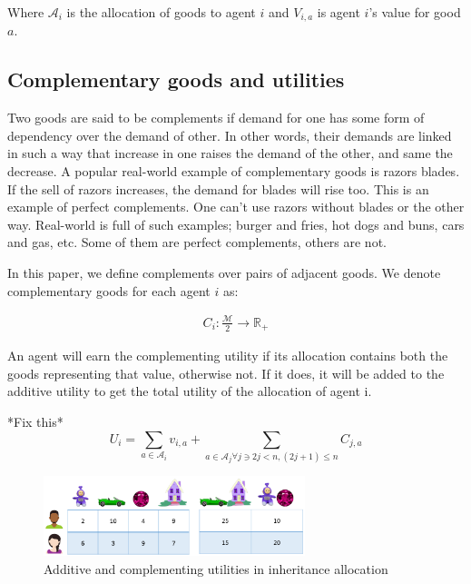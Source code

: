 Where $\mathcal{A}_i$ is the allocation of goods to agent $i$ and $V_{i,a}$ is agent $i$'s value for good $a$.

\subsection{Complementary goods and utilities}
\label{section_complementary}

Two goods are said to be complements if demand for one has some form of dependency over the demand of other. In other words, their demands are linked in such a way that increase in one raises the demand of the other, and same the decrease. A popular real-world example of complementary goods is razors blades. If the sell of razors increases, the demand for blades will rise too. This is an example of perfect complements. One can't use razors without blades or the other way. Real-world is full of such examples; burger and fries, hot dogs and buns, cars and gas, etc. Some of them are perfect complements, others are not.

In this paper, we define complements over pairs of adjacent goods. We denote complementary goods for each agent $i$ as: 

\begin{gather}
    C_i: \frac{\mathcal{M}}{2} \rightarrow \mathbb{R_+}
\end{gather}

An agent will earn the complementing utility if its allocation contains both the goods representing that value, otherwise not. If it does, it will be added to the additive utility to get the total utility of the allocation of agent i.

*Fix this*
$$
    U_i = \sum_{a \in \mathcal{A}_i} v_{i,a} + \sum_{a \in \mathcal{A}_j \forall j \ni 2j < n, (2j+1) \leq n} C_{j,a}
$$

\begin{figure}
\includegraphics[width=3in]{images/complementary_values.png}
\caption{Additive and complementing utilities in inheritance allocation}
\end{figure}


